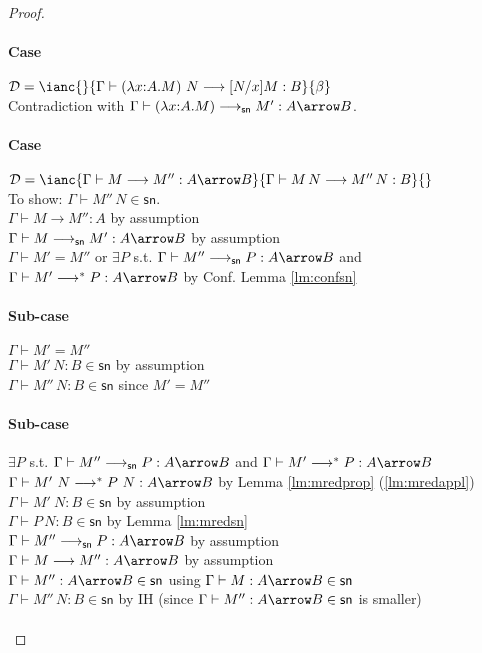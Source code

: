 \documentclass{article}
\newcommand{\csn}{\mathsf{sn}}
\newcommand{\mred}{\longrightarrow^*}
\newcommand{\red}{\longrightarrow}
\newcommand{\redsn}{\longrightarrow_\csn}
\begin{document}
\begin{proof}
\paragraph{Case} $\mathcal{D} = \ianc{}{\Gamma \vdash (\lambda x{:}A.M)~N \red [N/x]M : B}{\beta}$
\\[1em]
Contradiction with $\Gamma \vdash (\lambda x{:}A.M) \redsn M' : A \arrow B$.

\paragraph{Case} $\mathcal{D} = \ianc{\Gamma \vdash M \red M'' : A \arrow B}{\Gamma \vdash M\,N \red M''\,N: B}{}$
\\[1em]
To show: $\Gamma \vdash M''\,N \in \csn$.
\\[1em]
$\Gamma \vdash M \red M'' : A $ \hfill by assumption \\
$\Gamma \vdash M \redsn M' : A \arrow B$ \hfill by assumption \\
$\Gamma \vdash M' = M''$ or $\exists P$ s.t. $\Gamma \vdash M'' \redsn P : A \arrow B$ and $\Gamma \vdash M' \mred P: A \arrow B$ \hfill by Conf. Lemma \ref{lm:confsn}

\paragraph{Sub-case} $\Gamma \vdash M' = M''$
\\[1em]
$\Gamma \vdash M'\,N : B \in \csn$ \hfill by assumption \\
$\Gamma \vdash M''\,N : B \in \csn$ \hfill since $M' = M''$

\paragraph{Sub-case} $\exists P$ s.t. $\Gamma \vdash M'' \redsn P : A \arrow B$ and $\Gamma \vdash M' \mred P: A \arrow B$
\\[1em]
$\Gamma \vdash M'~N \mred P~N : A \arrow B$ \hfill by Lemma \ref{lm:mredprop} (\ref{lm:mredappl}) \\
$\Gamma \vdash M'~N : B \in \csn$ \hfill by assumption \\
$\Gamma \vdash P\,N : B \in \csn$ \hfill by Lemma \ref{lm:mredsn} \\
$\Gamma \vdash M'' \redsn P : A \arrow B$ \hfill by assumption \\
$\Gamma \vdash M \red M'' : A \arrow B$ \hfill by assumption \\
$\Gamma \vdash M'' : A \arrow B \in \csn$ \hfill using $\Gamma \vdash M : A \arrow B \in \csn$ \\
$\Gamma \vdash M''\,N : B \in \csn$ \hfill by IH (since $\Gamma \vdash M'': A \arrow B \in \csn$ is smaller) \\
\\[0.5em]


\end{proof}
\end{document}
